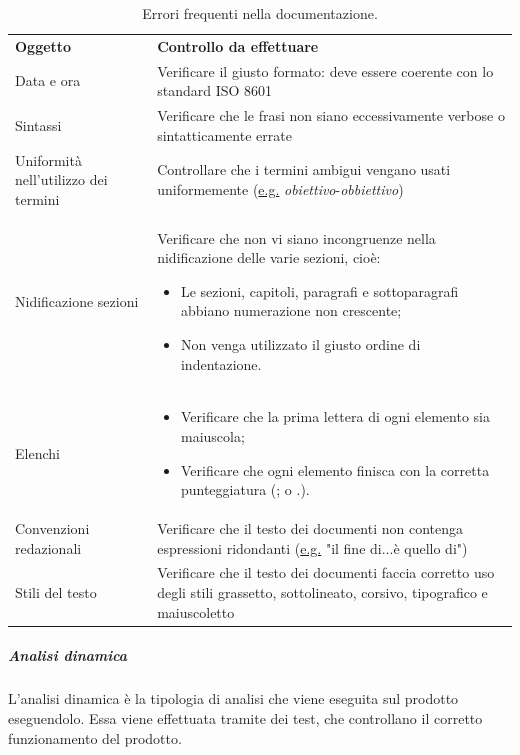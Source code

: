 \documentclass[../norme-di-progetto.tex]{subfiles}
\begin{document}
\begin{table}[H]
\centering
\begin{tabular}{p{5cm}p{10cm}}
\textbf{Oggetto}           & \textbf{Controllo da effettuare}      \\
Data e ora                              & Verificare il giusto formato: deve essere coerente con lo standard ISO 8601 \\
Sintassi                          & Verificare che le frasi non siano eccessivamente verbose o sintatticamente errate       \\
Uniformità nell'utilizzo dei termini & Controllare che i termini ambigui vengano usati uniformemente (\underline{e.g.} \textit{obiettivo}-\textit{obbiettivo}) \\
Nidificazione sezioni            & Verificare che non vi siano incongruenze nella nidificazione delle varie sezioni, cioè: \begin{itemize}
  \item Le sezioni, capitoli, paragrafi e sottoparagrafi abbiano numerazione non crescente;
  \item Non venga utilizzato il giusto ordine di indentazione.
\end{itemize}       \\
Elenchi                           & \begin{itemize}
  \item Verificare che la prima lettera di ogni elemento sia maiuscola;
  \item Verificare che ogni elemento finisca con la corretta punteggiatura (; o .).
\end{itemize}       \\
Convenzioni redazionali   & Verificare che il testo dei documenti non contenga espressioni ridondanti (\underline{e.g.} "il fine di...è quello di") \\
Stili del testo     & Verificare che il testo dei documenti faccia corretto uso degli stili grassetto, sottolineato, corsivo, tipografico e maiuscoletto \\
\end{tabular}
\caption{Errori frequenti nella documentazione.}
\end{table}

\subparagraph{Analisi dinamica}
L'analisi dinamica è la tipologia di analisi che viene eseguita sul prodotto eseguendolo. Essa viene effettuata tramite dei test, che controllano il corretto funzionamento del prodotto.
\end{document}
